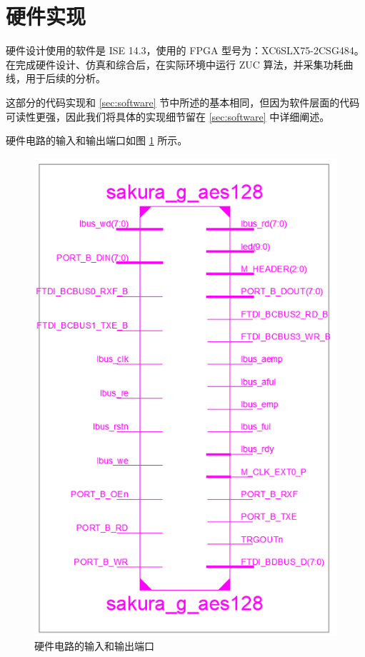 \section{硬件实现}
\label{sec:hardware}

硬件设计使用的软件是 ISE 14.3，使用的 FPGA 型号为：XC6SLX75-2CSG484。在完成硬件设计、仿真和综合后，在实际环境中运行 ZUC 算法，并采集功耗曲线，用于后续的分析。

这部分的代码实现和 \ref{sec:software} 节中所述的基本相同，但因为软件层面的代码可读性更强，因此我们将具体的实现细节留在 \ref{sec:software} 中详细阐述。

\newpage

硬件电路的输入和输出端口如图 \ref{fig:circuit_io} 所示。

\begin{figure}[htbp]
    \centering
    \includegraphics[height=.6\textheight]{../images/circuit_io.png}
    \caption{硬件电路的输入和输出端口}
    \label{fig:circuit_io}
\end{figure}

